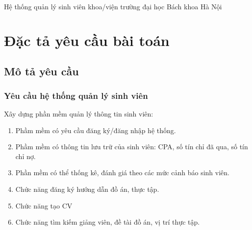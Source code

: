 



Hệ thống quản lý sinh viên khoa/viện trường đại học Bách khoa Hà Nội


\chapter{Đặc tả yêu cầu bài toán}
\section{Mô tả yêu cầu}
\subsection{Yêu cầu hệ thống quản lý sinh viên}
Xây dựng phần mềm quản lý thông tin sinh viên:
\begin{enumerate}
	\item Phầm mềm có yêu cầu đăng ký/đăng nhập hệ thống.
	\item Phầm mềm có thông tin lưu trữ của sinh viên: CPA, số tín chỉ đã qua, số tín chỉ nợ.
	\item Phần mềm có thể thống kê, đánh giá theo các mức cảnh báo sinh viên.
	\item Chức năng đăng ký hướng dẫn đồ án, thực tập.
	\item Chức năng tạo CV
	\item Chức năng tìm kiếm giảng viên, đề tài đồ án, vị trí thực tập.
\end{enumerate}

